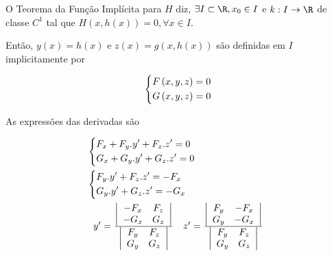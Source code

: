 \documentclass[11pt, oneside, a4paper]{gsm-l}
\begin{document}
\begin{dem}
    O Teorema da Função Implícita para $H$ diz, $\exists I \subset \R, x_0 \in I$ e $k: I \to \R$ de classe $C^1$ tal que $H\left( {x,h\left( x \right)} \right) = 0,\forall x \in I$.

    Então, $y\left( x \right) = h\left( x \right)$ e $z\left( x \right) = g\left( {x,h\left( x \right)} \right)$ são definidas em $I$ implicitamente por

\[
\left\{ \begin{gathered}
F\left( {x,y,z} \right) = 0 \hfill \\
G\left( {x,y,z} \right) = 0 \hfill \\
\end{gathered}  \right.
\]

As expressões das derivadas são

\[
\begin{gathered}
\left\{ \begin{gathered}
F_x  + F_y .y' + F_z .z' = 0 \hfill \\
G_x  + G_y .y' + G_z .z' = 0 \hfill \\
\end{gathered}  \right. \hfill \\
\left\{ \begin{gathered}
F_y .y' + F_z .z' =  - F_x  \hfill \\
G_y .y' + G_z .z' =  - G_x  \hfill \\
\end{gathered}  \right. \hfill \\
\begin{array}{*{20}c}
{y' = \frac{{\left| {\begin{array}{*{20}c}
{ - F_x } & {F_z }  \\
{ - G_x } & {G_z }  \\

\end{array} } \right|}}
{{\left| {\begin{array}{*{20}c}
{F_y } & {F_z }  \\
{G_y } & {G_z }  \\

\end{array} } \right|}}} & {z' = \frac{{\left| {\begin{array}{*{20}c}
{F_y } & { - F_x }  \\
{G_y } & { - G_x }  \\

\end{array} } \right|}}
{{\left| {\begin{array}{*{20}c}
{F_y } & {F_z }  \\
{G_y } & {G_z }  \\

\end{array} } \right|}}}  \\

\end{array}  \hfill \\
\end{gathered}
\]

\end{dem}
\end{document}
